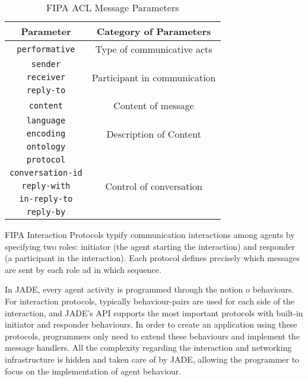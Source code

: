 \begin{table}
	\normalsize
	\caption{FIPA ACL Message Parameters}
	\label{tab:fipaACLMessage}
	\begin{center}
		\begin{tabular}{c|c}
		\hline
		\textbf{Parameter} & \textbf{Category of Parameters} \\
		\hline
		\colorbox{Apricot}{\texttt{performative}} & Type of communicative acts \\
		\hline
		\colorbox{Apricot}{\texttt{sender}} & \multirow{3}{*}{Participant in communication} \\
		\cline{1-1}
		\colorbox{Apricot}{\texttt{receiver}} \\
		\cline{1-1}
		\texttt{reply-to}  \\
		\hline
		\colorbox{Apricot}{\texttt{content}} & Content of message \\
		\hline
		\texttt{language} & \multirow{3}{*}{Description of Content} \\
		\cline{1-1}
		\texttt{encoding} \\
		\cline{1-1}
		\colorbox{Apricot}{\texttt{ontology}} \\
		\hline
		\colorbox{Apricot}{\texttt{protocol}} & \multirow{5}{*}{Control of conversation} \\
		\cline{1-1}
		\colorbox{Apricot}{\texttt{conversation-id}} \\
		\cline{1-1}
		\texttt{reply-with} \\
		\cline{1-1}
		\texttt{in-reply-to} \\
		\cline{1-1}
		\colorbox{Apricot}{\texttt{reply-by}} \\
		\hline
		\end{tabular}
	\end{center}
\end{table} 

FIPA Interaction Protocols typify communication interactions among agents by specifying two roles: initiator (the agent starting the interaction) and responder (a participant in the interaction). Each protocol defines precisely which messages are sent by each role ad in which sequence.

In JADE, every agent activity is programmed through the notion o behaviours. For interaction protocols, typically behaviour-pairs are used for each side of the interaction, and JADE's API supports the most important protocols with built-in initiator and responder behaviours.
In order to create an application using these protocols, programmers only need to extend these behaviours and implement the message handlers.
All the complexity regarding the interaction and networking infrastructure is hidden and taken care of by JADE, allowing the programmer to focus on the implementation of agent behaviour.


